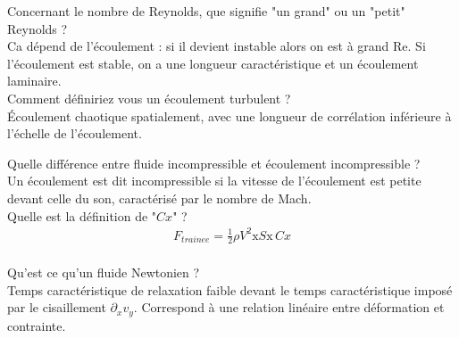 \documentclass[12pt,prb,aps,epsf]{article}
\begin{document}
Concernant le nombre de Reynolds, que signifie "un grand" ou un "petit" Reynolds ?\\
Ca dépend de l'écoulement : si il devient instable alors on est à grand Re. Si l'écoulement est stable, on a une longueur caractéristique et un écoulement laminaire.\\

Comment définiriez vous un écoulement turbulent ? \\
Écoulement chaotique spatialement, avec une longueur de corrélation inférieure à l'échelle de l'écoulement.

Quelle différence entre fluide incompressible et écoulement incompressible ?\\
Un écoulement est dit incompressible si la vitesse de l'écoulement est petite devant celle du son, caractérisé par le nombre de Mach.\\

Quelle est la définition de "$Cx$" ?
\begin{eqnarray}
F_{trainee} = \frac{1}{2}\rho V^2 \mathrm{x}S\mathrm{x}\,Cx
\end{eqnarray}
\\
Qu'est ce qu'un fluide Newtonien ?\\
Temps caractéristique de relaxation faible devant le temps caractéristique imposé par le cisaillement $\partial_xv_y$. Correspond à une relation linéaire entre déformation et contrainte.
	
\end{document}
